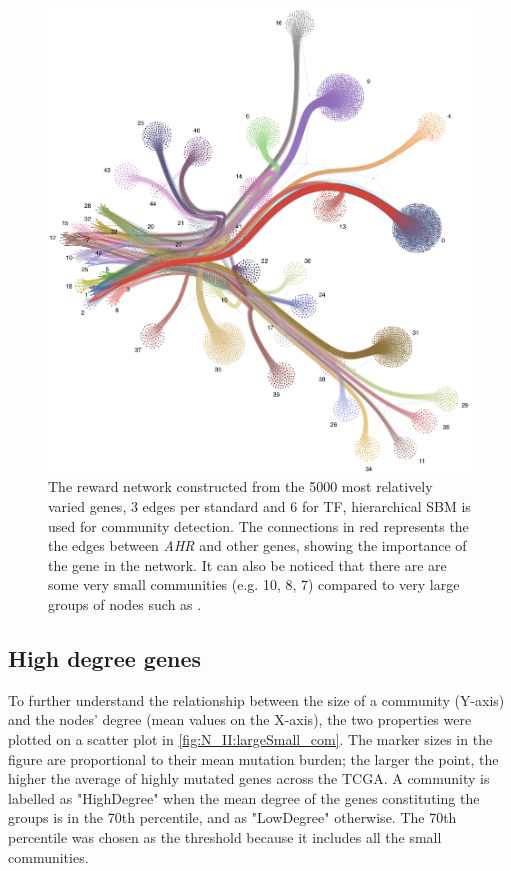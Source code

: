 \begin{figure}[H]    
    \centering
    \includegraphics[width=1.0\textwidth,height=1.0\textheight,keepaspectratio]{Sections/Network_II/resources/reward/sigmoid_5K_Net_II_label_2.png}
    \caption{The reward network constructed from the 5000 most relatively varied genes, 3 edges per standard and 6 for TF, hierarchical SBM is used for community detection. The connections in red represents the the edges between \textit{AHR} and other genes, showing the importance of the gene in the network. It can also be noticed that there are are some very small communities (e.g. 10, 8, 7) compared to very large groups of nodes such as .}
    \label{fig:N_II:reward_net}
\end{figure}


\subsection{High degree genes} \label{s:N_II:high_conn}

To further understand the relationship between the size of a community (Y-axis) and the nodes' degree (mean values on the X-axis), the two properties were plotted on a scatter plot in \cref{fig:N_II:largeSmall_com}. The marker sizes in the figure are proportional to their mean mutation burden; the larger the point, the higher the average of highly mutated genes across the TCGA. A community is labelled as "HighDegree" when the mean degree of the genes constituting the groups is in the 70th percentile, and as "LowDegree" otherwise. The 70th percentile was chosen as the threshold because it includes all the small communities.



